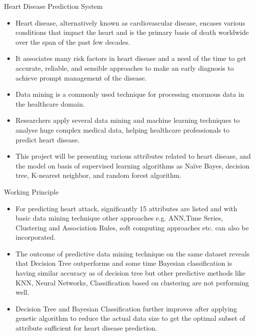 \documentclass{SKP-beamer}
\begin{document}
\begin{frame}{Heart Disease Prediction System}
	\begin{itemize}
		\item Heart disease, alternatively known as cardiovascular disease, encases various conditions that impact the heart and is the primary basis of death worldwide over the span of the past few decades.
		\item  It associates many risk factors in heart disease and a need of the time to get accurate, reliable, and sensible approaches to make an early diagnosis to achieve prompt management of the disease. 
		\item Data mining is a commonly used technique for processing enormous data in the healthcare domain.
		\item Researchers apply several data mining and machine learning techniques to analyse huge complex medical data, helping healthcare professionals to predict heart disease. 
		\item This project will be presenting various attributes related to heart disease, and the model on basis of supervised learning algorithms as Naïve Bayes, decision tree, K-nearest neighbor, and random forest algorithm.
	\end{itemize}
\end{frame}

\begin{frame}{Working Principle}
	\begin{itemize}
		\item For predicting heart attack, significantly 15 attributes are listed
		and with basic data mining technique other approaches e.g. ANN,Time Series, Clustering and Association Rules, soft computing approaches etc. can also be incorporated. 
		\item The outcome of predictive data mining technique on the same dataset reveals that
		Decision Tree outperforms and some time Bayesian classification is having similar accuracy as of decision tree but other predictive methods like KNN, Neural Networks, Classification based on clustering are not performing well.
		\item Decision Tree and Bayesian Classification further improves after applying genetic algorithm to reduce the actual data size to get the optimal subset of attribute sufficient for heart disease prediction.
	\end{itemize}
\end{frame}
\end{document}
